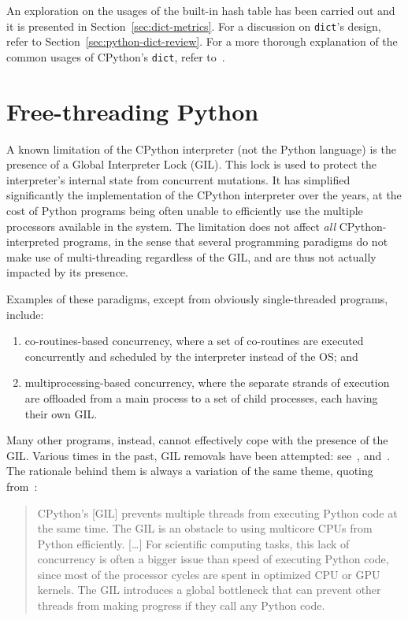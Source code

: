 An exploration on the usages of the built-in hash table has been carried out and it is presented in Section~\ref{sec:dict-metrics}.
For a discussion on \texttt{dict}'s design, refer to Section~\ref{sec:python-dict-review}.
For a more thorough explanation of the common usages of CPython's \texttt{dict}, refer to~\cite[\S Principal Use Cases for Dictionaries]{dict-notes}.


\section{Free-threading Python}\label{sec:free-threading}

A known limitation of the CPython interpreter (not the Python language) is the presence of a Global Interpreter Lock (GIL).
This lock is used to protect the interpreter's internal state from concurrent mutations.
It has simplified significantly the implementation of the CPython interpreter over the years, at the cost of Python programs being often unable to efficiently use the multiple processors available in the system.
The limitation does not affect \emph{all} CPython-interpreted programs, in the sense that several programming paradigms do not make use of multi-threading regardless of the GIL, and are thus not actually impacted by its presence.

Examples of these paradigms, except from obviously single-threaded programs, include:
\begin{enumerate}
    \item co-routines-based concurrency, where a set of co-routines are executed concurrently and scheduled by the interpreter instead of the OS; and
    \item multiprocessing-based concurrency, where the separate strands of execution are offloaded from a main process to a set of child processes, each having their own GIL\@.
\end{enumerate}

Many other programs, instead, cannot effectively cope with the presence of the GIL\@.
Various times in the past, GIL removals have been attempted: see~\cite{dabeaz-gil}, and~\cite[\S Related Work]{pep703}.
The rationale behind them is always a variation of the same theme, quoting from~\cite{pep703}:
\begin{quote}
    CPython's [GIL] prevents multiple threads from executing Python code at the same time.
    The GIL is an obstacle to using multicore CPUs from Python efficiently.
    [\ldots] For scientific computing tasks, this lack of concurrency is often a bigger issue than speed of executing Python code, since most of the processor cycles are spent in optimized CPU or GPU kernels.
    The GIL introduces a global bottleneck that can prevent other threads from making progress if they call any Python code.
\end{quote}


